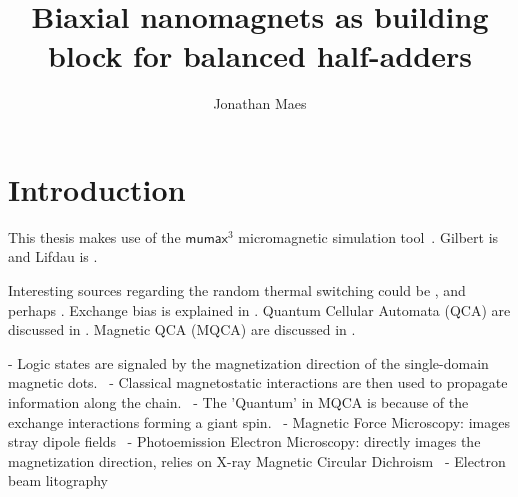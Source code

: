 \documentclass[10pt,a4paper]{article}
\author{Jonathan Maes}
\title{Biaxial nanomagnets as building block for balanced half-adders}
\newcommand{\mumax}{$\mathsf{mumax}^3$}
\begin{document}
\begin{titlingpage}
\maketitle
\end{titlingpage}

\newpage
{}

\tableofcontents
\newpage
{}

\section{Introduction}
This thesis makes use of the \mumax{} micromagnetic simulation tool~\cite{MuMax3}.
Gilbert is \cite{Gilbert1956} and Lifdau is \cite{LANDAU1992}.

Interesting sources regarding the random thermal switching could be \cite{ThermFluc_SingleDomain, RandomSwitch_MonteCarlo, Nonmonotonic_reversal}, and perhaps \cite{MagDynamics_JumpNoise}.
Exchange bias is explained in \cite{ExchangeBias, ExchangeBias_nanostructures, ExchangeBias_Mechanisms}.
Quantum Cellular Automata (QCA) are discussed in \cite{QCA_Algorithms, QCA_ImageRecognition, QCA_GameOfLife}. Magnetic QCA (MQCA) are discussed in \cite{MQCA_MajorityGate, MQCA_RoomTemp}.


- Logic states are signaled by the magnetization direction of the single-domain magnetic dots.~\cite{MQCA_RoomTemp}
- Classical magnetostatic interactions are then used to propagate information along the chain.~\cite{MQCA_RoomTemp}
- The 'Quantum' in MQCA is because of the exchange interactions forming a giant spin.~\cite{MQCA_RoomTemp}
- Magnetic Force Microscopy: images stray dipole fields~\cite{NML_Carlton}
- Photoemission Electron Microscopy: directly images the magnetization direction, relies on X-ray Magnetic Circular Dichroism~\cite{NML_Carlton}
- Electron beam litography~\cite{NML_Carlton}
\end{document}
